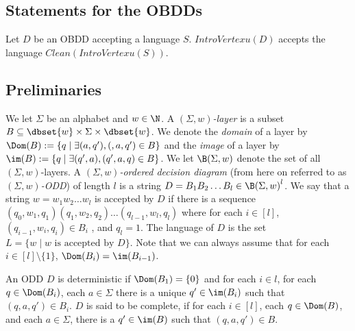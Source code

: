 \subsection{Statements for the OBDDs}

\begin{lemma}
Let $D$ be an OBDD accepting a language $S$. $IntroVertex{u}(D)$ accepts the language $Clean(IntroVertex{u}(S))$. 
\end{lemma}




\subsection{Preliminaries}

 We let $\Sigma$ be an alphabet and $w \in \N$. A  $(\Sigma, w)$\emph{-layer} is a subset $B \subseteq \dbset{w} \times \Sigma \times \dbset{w}$. We denote the \emph{domain} of a layer by $\Dom(B):= \{q \;|\; \exists (a,q'), (,a,q') \in B\}$ and the \emph{image} of a layer by $\im(B):= \{q \;|\; \exists (q',a), (q',a,q) \in B\}$. We let  $\B(\Sigma, w)$ denote the set of all $(\Sigma,w)$-layers. A $(\Sigma,w)$\emph{-ordered decision diagram} (from here on referred to as $(\Sigma,w)$\emph{-ODD}) of length $l$ is a string $D = B_1B_2\ldots B_l \in {\B(\Sigma, w)}^l$. We say that a string $w=w_1 w_2 \ldots w_l$ is accepted by $D$ if there is a sequence $(q_0, w_1,q_1)(q_1,w_2,q_2)\ldots(q_{l-1},w_l,q_l)$ where for each $i \in [l]$, $(q_{i-1},w_i,q_i) \in B_i$ , and $q_l = 1$. The language of $D$ is the set $L= \{w\; | \; w \text{ is accepted by } D\}$. Note that we can always assume that for each $i \in [l] \setminus \{1\}$, $\Dom(B_i) = \im(B_{i-1})$. \

An ODD $D$ is deterministic if $\Dom(B_1) = \{0\}$ and for each $i \in l$, for each $q \in \Dom(B_i)$, each $a \in \Sigma$ there is a unique $q'\in \im(B_i)$ such that $(q,a,q') \in B_i$. $D$ is said to be complete, if for each 
$i\in [l]$, each $q\in \Dom(B)$, and each $a\in \Sigma$, 
there is a $q'\in \im(B)$ such that $(q,a,q')\in B$.\\


